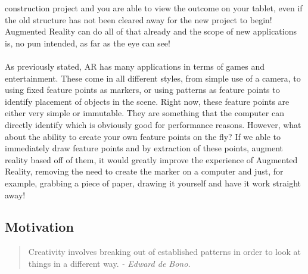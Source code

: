 \documentclass[11pt]{article}
\begin{document}
construction project and you are able to view the outcome on your tablet, even
if the old structure has not been cleared away for the new project to begin!
Augmented Reality can do all of that already and the scope of new
applications is, no pun intended, as far as the eye can see!\\ 
\\
As previously stated, AR has many applications in terms of games and 
entertainment. These come in all different styles, from simple use of a camera,
to using fixed feature points as markers, or using patterns as feature points
to identify placement of objects in the scene. Right now, these feature points
are either very simple or immutable. They are something that the computer
can directly identify which is obviously good for performance reasons. However,
what about the ability to create your own feature points on the fly? If we
able to immediately draw feature points and by extraction of these points, 
augment reality based off of them, it would greatly improve the 
experience of Augmented Reality, removing the need to create the marker 
on a computer and just, for example, grabbing a piece of paper, drawing it
yourself and have it work straight away!

\subsection{Motivation}
\begin{quote}
Creativity involves breaking out of established patterns in
		order to look at things in a different way. \textit{- Edward de Bono.}
\end{quote}
\end{document}
